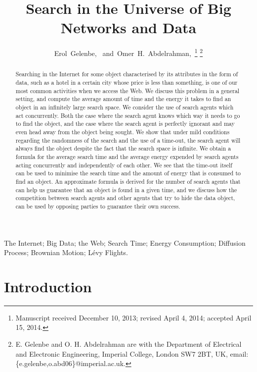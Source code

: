\documentclass[journal]{IEEEtran}
\begin{document}
\title{Search in the Universe of Big Networks and Data}
\author{Erol~Gelenbe,~
        and~Omer~H.~Abdelrahman,~\thanks{Manuscript received December 10, 2013; revised April 4, 2014; accepted April 15, 2014.}
\thanks{E. Gelenbe and O. H. Abdelrahman are with the Department
of Electrical and Electronic Engineering, Imperial College, London SW7 2BT, UK, email: \{e.gelenbe,o.abd06\}@imperial.ac.uk.}}
\maketitle
\begin{abstract}
Searching in the Internet for some object characterised by its attributes in the form of data, such as a hotel in a certain city whose price is less than something, is one of our most common activities when we access the Web. We discuss this problem in a general setting, and compute the average amount of time and the energy it takes to find an object
in an infinitely large search space. We consider the use of  search agents which act concurrently. Both
the case where the search agent knows which way it needs to go to find the object, and the case where the search agent is perfectly ignorant and may even head
away from the object being sought. We show that under mild conditions regarding the randomness of the search and the use of a time-out, the search agent will always find the object despite the fact that the search space is infinite. We obtain a formula for the average search time and the average energy expended by  search agents acting concurrently and independently of each other. We see that the time-out itself can be used to minimise the search time and the amount of energy that is consumed to find an object. An approximate formula is derived for the number of search agents that can help us guarantee that an object is found in a  given time, and we discuss how
the competition between search agents and other agents that try to hide the data object, can be used by opposing parties to guarantee their own success.
\end{abstract}
\begin{IEEEkeywords} The Internet; Big Data;  the Web; Search Time;  Energy Consumption; Diffusion Process; Brownian Motion; L\'evy Flights.
\end{IEEEkeywords}




\section{Introduction}\label{Basic}
\end{document}
